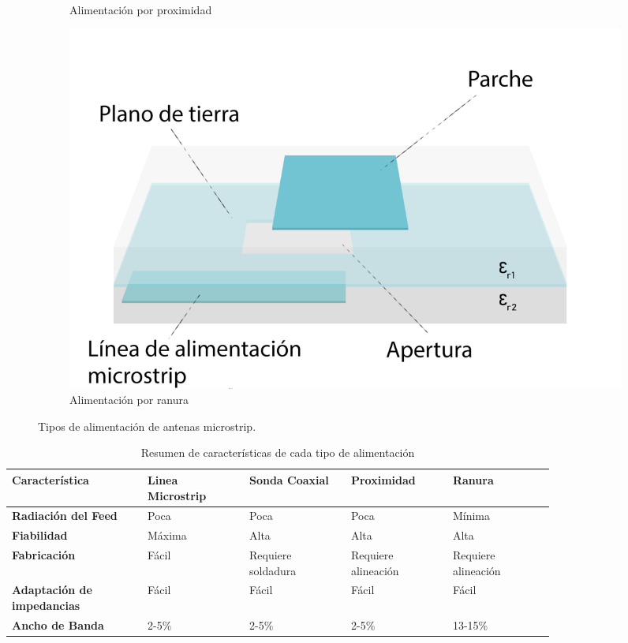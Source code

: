 \begin{figure}[h]
\begin{subfigure}[b]{0.45\textwidth}
         \caption{Alimentación por proximidad}
         \label{fig:proximidad}
     \end{subfigure}
     \hfill
     \begin{subfigure}[b]{0.45\textwidth}
         \centering
         \includegraphics[width=\textwidth]{archivos/parche/apertura}
         \caption{Alimentación por ranura}
         \label{fig:ranura}
     \end{subfigure}
        \caption{Tipos de alimentación de antenas microstrip.}
        \label{fig:sistemas}
\end{figure}

\begin{table}[H]
   
   \label{tab:example}
   \small %
   \centering %
   \begin{tabular}{m{0.2\linewidth}m{0.15\linewidth}m{0.15\linewidth}m{0.15\linewidth}m{0.15\linewidth}} %
   \toprule[\heavyrulewidth]\toprule[\heavyrulewidth]
   \textbf{Característica} & \textbf{Linea Microstrip} & \textbf{Sonda Coaxial} & \textbf{Proximidad} & \textbf{Ranura} \\ 
   \midrule
   \textbf{Radiación del Feed} & Poca & Poca & Poca & Mínima \\
   \textbf{Fiabilidad} & Máxima & Alta & Alta & Alta \\
   \textbf{Fabricación} & Fácil & Requiere soldadura & Requiere alineación & Requiere alineación \\
   \textbf{Adaptación de impedancias} & Fácil & Fácil & Fácil & Fácil \\
   \textbf{Ancho de Banda} & 2-5\% & 2-5\% & 2-5\% & 13-15\% \\
   
   \bottomrule[\heavyrulewidth] 
   \end{tabular}
   \caption{Resumen de características de cada tipo de alimentación} 
\end{table}



